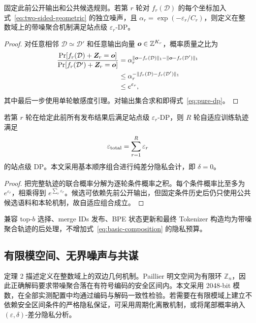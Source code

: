 \begin{theorem}[抽象整数机制的单轮站点级 DP]
固定此前公开输出和公共候选规则。若第 $r$ 轮对 $f_r(\mathcal D)$ 的每个坐标加入式~\eqref{eq:two-sided-geometric} 的独立噪声，且 $\alpha_r=\exp(-\varepsilon_r/C_r)$，则定义在整数域上的带噪聚合机制满足站点级 $\varepsilon_r$-DP。
\end{theorem}
\begin{proof}
对任意相邻 $\mathcal D\simeq\mathcal D'$ 和任意输出向量 $\bm{o}\in\mathbb Z^{K_r}$，概率质量之比为
\begin{align*}
\frac{\Pr[f_r(\mathcal D)+\bm{Z}_r=\bm{o}]}
{\Pr[f_r(\mathcal D')+\bm{Z}_r=\bm{o}]}
&=\alpha_r^{\|\bm{o}-f_r(\mathcal D)\|_1-
\|\bm{o}-f_r(\mathcal D')\|_1}\\
&\leq \alpha_r^{-\|f_r(\mathcal D)-f_r(\mathcal D')\|_1}\\
&\leq e^{\varepsilon_r},
\end{align*}
其中最后一步使用单轮敏感度引理。对输出集合求和即得式~\eqref{eq:pure-dp}。
\end{proof}

\begin{theorem}[多轮基本顺序组合]
若第 $r$ 轮在给定此前所有发布结果后满足站点级 $\varepsilon_r$-DP，则 $R$ 轮自适应训练轨迹满足
\begin{equation}
 \varepsilon_{\rm total}=\sum_{r=1}^{R}\varepsilon_r
 \label{eq:basic-composition}
\end{equation}
的站点级 DP。本文采用基本顺序组合进行纯差分隐私会计，即 $\delta=0$。
\end{theorem}
\begin{proof}
把完整轨迹的联合概率分解为逐轮条件概率之积。每个条件概率比至多为 $e^{\varepsilon_r}$，相乘得到 $e^{\sum_r\varepsilon_r}$。候选可依赖先前公开输出，但固定条件历史后仍只使用公共候选语料和本轮机制，故自适应组合成立。
\end{proof}

\begin{corollary}[后处理]
兼容 top-$b$ 选择、merge IDs 发布、BPE 状态更新和最终 Tokenizer 构造均为带噪聚合轨迹的后处理，不增加式~\eqref{eq:basic-composition} 的隐私预算。
\end{corollary}

\subsection{有限模空间、无界噪声与共谋}

定理 2 描述定义在整数域上的双边几何机制。Paillier 明文空间为有限环 $\mathbb Z_n$，因此正确解码要求带噪聚合落在有符号编码的安全区间内。本文采用 2048-bit 模数，在全部实测配置中均通过编码与解码一致性检验。若需要在有限模域上建立不依赖安全区间条件的严格隐私保证，可采用周期化离散机制，或将尾部概率纳入 $(\varepsilon,\delta)$-差分隐私分析。

